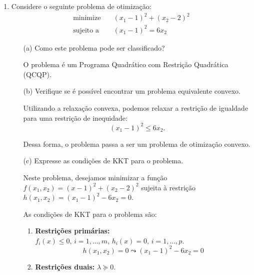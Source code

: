 \documentclass[11pt,a4paper]{article}
\begin{document}

\begin{enumerate}
    \item Considere o seguinte problema de otimização:
        \begin{align*}
            \text{minimize} & \quad (x_1 - 1)^2 + (x_2 - 2)^2\\
            \text{sujeito a} & \quad (x_1 - 1)^2 = 6x_2 
        \end{align*}
        \begin{itemize}
            \item[(a)] Como este problema pode ser classificado?
            
            O problema é um Programa Quadrático com Restrição Quadrática (QCQP). 

            \item[(b)] Verifique se é possível encontrar um problema equivalente convexo.
            
            Utilizando a relaxação convexa, podemos relaxar a restrição de igualdade para uma restrição de inequidade:
            \begin{equation*}
                (x_1 - 1)^2 \leq 6x_2.
            \end{equation*}

            Dessa forma, o problema passa a ser um problema de otimização convexo.

            \item[(c)] Expresse as condições de KKT para o problema.
            
            Neste problema, desejamos minimizar a função $f(x_1, x_2) = (x-1)^2 + (x_2 - 2)^2$ sujeita à restrição $h(x_1, x_2) = (x_1 - 1)^2 - 6x_2 = 0$.

            As condições de KKT para o problema são:

            \begin{enumerate}[label=\Roman*]
                \item \textbf{Restrições primárias:} $f_i(x) \leq 0, \, i=1,\dots, m, \, h_i(x) = 0, \, i=1, \dots, p$.
                \begin{equation}
                    h(x_1,x_2) = 0 \leadsto (x_1 - 1)^2 - 6x_2 = 0
                    \label{eq:primal-constraint}
                \end{equation}
                \item \textbf{Restrições duais:} $\lambda \succeq 0$.
                

\end{enumerate}
\end{itemize}
\end{enumerate}
\end{document}
